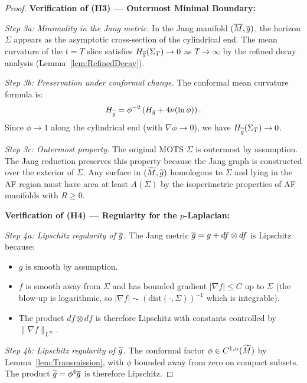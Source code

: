 \begin{proof}
\textbf{Verification of (H3) --- Outermost Minimal Boundary:}

\textit{Step 3a: Minimality in the Jang metric.}
In the Jang manifold $(\overline{M}, \overline{g})$, the horizon $\Sigma$ appears as the asymptotic cross-section of the cylindrical end. The mean curvature of the $t = T$ slice satisfies $H_{\overline{g}}(\Sigma_T) \to 0$ as $T \to \infty$ by the refined decay analysis (Lemma~\ref{lem:RefinedDecay}).

\textit{Step 3b: Preservation under conformal change.}
The conformal mean curvature formula is:
\begin{equation}
    H_{\widetilde{g}} = \phi^{-2}\left(H_{\overline{g}} + 4\nu(\ln\phi)\right).
\end{equation}
Since $\phi \to 1$ along the cylindrical end (with $\nabla \phi \to 0$), we have $H_{\widetilde{g}}(\Sigma_T) \to 0$.

\textit{Step 3c: Outermost property.}
The original MOTS $\Sigma$ is outermost by assumption. The Jang reduction preserves this property because the Jang graph is constructed over the exterior of $\Sigma$. Any surface in $(\widetilde{M}, \widetilde{g})$ homologous to $\Sigma$ and lying in the AF region must have area at least $A(\Sigma)$ by the isoperimetric properties of AF manifolds with $R \ge 0$.

\textbf{Verification of (H4) --- Regularity for the $p$-Laplacian:}

\textit{Step 4a: Lipschitz regularity of $\overline{g}$.}
The Jang metric $\overline{g} = g + df \otimes df$ is Lipschitz because:
\begin{itemize}
    \item $g$ is smooth by assumption.
    \item $f$ is smooth away from $\Sigma$ and has bounded gradient $|\nabla f| \le C$ up to $\Sigma$ (the blow-up is logarithmic, so $|\nabla f| \sim (\text{dist}(\cdot, \Sigma))^{-1}$ which is integrable).
    \item The product $df \otimes df$ is therefore Lipschitz with constants controlled by $\|\nabla f\|_{L^\infty}$.
\end{itemize}

\textit{Step 4b: Lipschitz regularity of $\widetilde{g}$.}
The conformal factor $\phi \in C^{1,\alpha}(\widetilde{M})$ by Lemma~\ref{lem:Transmission}, with $\phi$ bounded away from zero on compact subsets. The product $\widetilde{g} = \phi^4 \overline{g}$ is therefore Lipschitz.


\end{proof}
